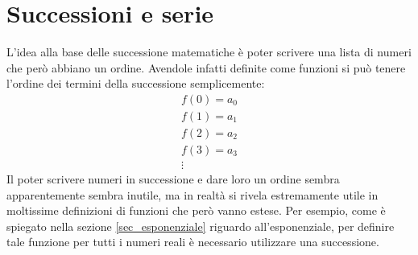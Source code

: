 \section{Successioni e serie} \label{sec_successioni}
L'idea alla base delle successione matematiche è poter scrivere una lista di numeri che però abbiano un ordine. Avendole infatti definite come funzioni si può tenere l'ordine dei termini della successione semplicemente:
\begin{gather*}
    f(0) = a_0\\
    f(1) = a_1\\
    f(2) = a_2\\
    f(3) = a_3\\
    \vdots
\end{gather*}
Il poter scrivere numeri in successione e dare loro un ordine sembra apparentemente sembra inutile, ma in realtà si rivela estremamente utile in moltissime definizioni di funzioni che però vanno estese. Per esempio, come è spiegato nella sezione \ref{sec_esponenziale} riguardo all'esponenziale, per definire tale funzione per tutti i numeri reali è necessario utilizzare una successione.\\


